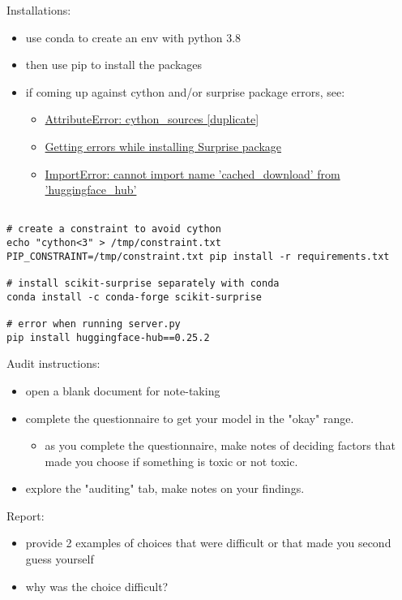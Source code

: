 \documentclass[11pt]{article}
\begin{document}
\begin{enumerate}
\begin{enumerate}
\begin{enumerate}
Installations:
\begin{itemize}
\item use conda to create an env with python 3.8
\item then use pip to install the packages
\item if coming up against cython and/or surprise package errors, see:
\begin{itemize}
\item \href{https://stackoverflow.com/questions/77490435/attributeerror-cython-sources}{AttributeError: cython\_sources [duplicate}]
\item \href{https://stackoverflow.com/questions/65679417/getting-errors-while-installing-surprise-package}{Getting errors while installing Surprise package}
\item \href{https://stackoverflow.com/questions/79374322/importerror-cannot-import-name-cached-download-from-huggingface-hub}{ImportError: cannot import name 'cached\_download' from 'huggingface\_hub'}
\end{itemize}
\end{itemize}

\begin{verbatim}

# create a constraint to avoid cython
echo "cython<3" > /tmp/constraint.txt 
PIP_CONSTRAINT=/tmp/constraint.txt pip install -r requirements.txt

# install scikit-surprise separately with conda
conda install -c conda-forge scikit-surprise

# error when running server.py
pip install huggingface-hub==0.25.2

\end{verbatim}

Audit instructions:
\begin{itemize}
\item open a blank document for note-taking
\item complete the questionnaire to get your model in the "okay" range. 
\begin{itemize}
\item as you complete the questionnaire, make notes of deciding factors
that made you choose if something is toxic or not toxic.
\end{itemize}
\item explore the "auditing" tab, make notes on your findings.
\end{itemize}

Report:
\begin{itemize}
\item provide 2 examples of choices that were difficult or that made you
second guess yourself
\item why was the choice difficult?
\end{itemize}
\end{enumerate}


\end{enumerate}
\end{enumerate}
\end{document}
